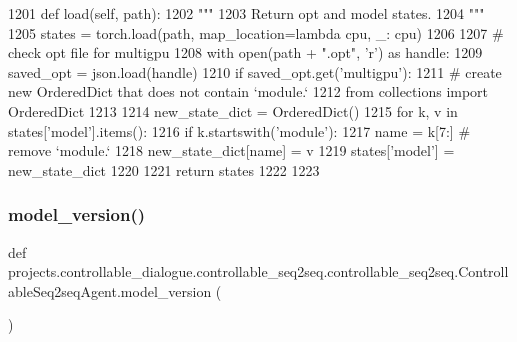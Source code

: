 \begin{DoxyCode}
1201     \textcolor{keyword}{def }load(self, path):
1202         \textcolor{stringliteral}{"""}
1203 \textcolor{stringliteral}{        Return opt and model states.}
1204 \textcolor{stringliteral}{        """}
1205         states = torch.load(path, map\_location=\textcolor{keyword}{lambda} cpu, \_: cpu)
1206 
1207         \textcolor{comment}{# check opt file for multigpu}
1208         with open(path + \textcolor{stringliteral}{".opt"}, \textcolor{stringliteral}{'r') as handle:}
1209 \textcolor{stringliteral}{            saved\_opt = json.load(handle)}
1210 \textcolor{stringliteral}{        }\textcolor{keywordflow}{if} saved\_opt.get(\textcolor{stringliteral}{'multigpu'}):
1211             \textcolor{comment}{# create new OrderedDict that does not contain `module.`}
1212             \textcolor{keyword}{from} collections \textcolor{keyword}{import} OrderedDict
1213 
1214             new\_state\_dict = OrderedDict()
1215             \textcolor{keywordflow}{for} k, v \textcolor{keywordflow}{in} states[\textcolor{stringliteral}{'model'}].items():
1216                 \textcolor{keywordflow}{if} k.startswith(\textcolor{stringliteral}{'module'}):
1217                     name = k[7:]  \textcolor{comment}{# remove `module.`}
1218                     new\_state\_dict[name] = v
1219             states[\textcolor{stringliteral}{'model'}] = new\_state\_dict
1220 
1221         \textcolor{keywordflow}{return} states
1222 
1223 
\end{DoxyCode}
\mbox{\label{classprojects_1_1controllable__dialogue_1_1controllable__seq2seq_1_1controllable__seq2seq_1_1ControllableSeq2seqAgent_ab10efe928769fe5a7d398930e1d5174c}} 
\subsubsection{\texorpdfstring{model\+\_\+version()}{model\_version()}}
{\footnotesize\ttfamily def projects.\+controllable\+\_\+dialogue.\+controllable\+\_\+seq2seq.\+controllable\+\_\+seq2seq.\+Controllable\+Seq2seq\+Agent.\+model\+\_\+version (\begin{DoxyParamCaption}{ }\end{DoxyParamCaption})\hspace{0.3cm}{\ttfamily [static]}}

